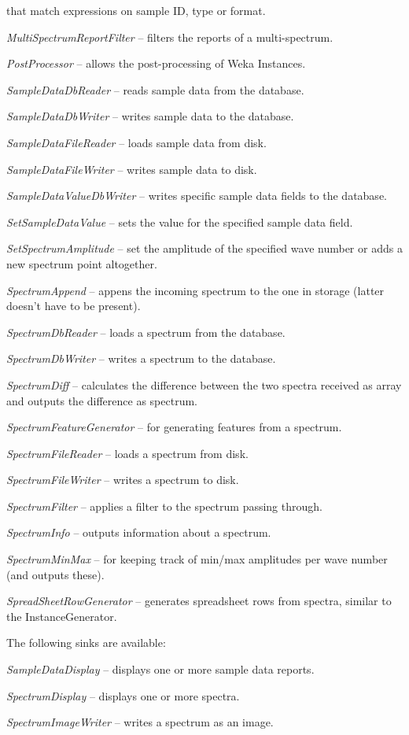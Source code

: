 \documentclass[a4paper]{book}
\begin{document}
\begin{tight_itemize}
  that match expressions on sample ID, type or format.
  \item \textit{MultiSpectrumReportFilter} -- filters the reports of a
  multi-spectrum.
  \item \textit{PostProcessor} -- allows the post-processing of Weka Instances.
  \item \textit{SampleDataDbReader} -- reads sample data from the database.
  \item \textit{SampleDataDbWriter} -- writes sample data to the database.
  \item \textit{SampleDataFileReader} -- loads sample data from disk.
  \item \textit{SampleDataFileWriter} -- writes sample data to disk.
  \item \textit{SampleDataValueDbWriter} -- writes specific sample data fields
  to the database.
  \item \textit{SetSampleDataValue} -- sets the value for the specified
  sample data field.
  \item \textit{SetSpectrumAmplitude} -- set the amplitude of the
  specified wave number or adds a new spectrum point altogether.
  \item \textit{SpectrumAppend} -- appens the incoming spectrum to the one
  in storage (latter doesn't have to be present).
  \item \textit{SpectrumDbReader} -- loads a spectrum from the database.
  \item \textit{SpectrumDbWriter} -- writes a spectrum to the database.
  \item \textit{SpectrumDiff} -- calculates the difference between the
  two spectra received as array and outputs the difference as spectrum.
  \item \textit{SpectrumFeatureGenerator} -- for generating features from
  a spectrum.
  \item \textit{SpectrumFileReader} -- loads a spectrum from disk.
  \item \textit{SpectrumFileWriter} -- writes a spectrum to disk.
  \item \textit{SpectrumFilter} -- applies a filter to the spectrum passing through.
  \item \textit{SpectrumInfo} -- outputs information about a spectrum.
  \item \textit{SpectrumMinMax} -- for keeping track of min/max amplitudes per
  wave number (and outputs these).
  \item \textit{SpreadSheetRowGenerator} -- generates spreadsheet rows from spectra,
  similar to the InstanceGenerator.
\end{tight_itemize}
The following sinks are available:
\begin{tight_itemize}
  \item \textit{SampleDataDisplay} -- displays one or more sample data reports.
  \item \textit{SpectrumDisplay} -- displays one or more spectra.
  \item \textit{SpectrumImageWriter} -- writes a spectrum as an image.
\end{tight_itemize}
\end{document}

